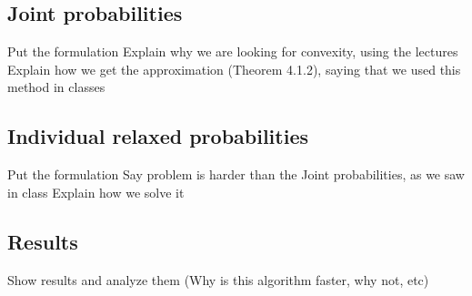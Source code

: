 \documentclass{beamer}
\begin{document}
\subsection{Joint probabilities}
\begin{frame}
Put the formulation
Explain why we are looking for convexity, using the lectures
Explain how we get the approximation (Theorem 4.1.2), saying that we used this method in classes

\end{frame}

\subsection{Individual relaxed probabilities}
\begin{frame}
Put the formulation
Say problem is harder than the Joint probabilities, as we saw in class
Explain how we solve it
\end{frame}

\subsection{Results}
\begin{frame}
Show results and analyze them (Why is this algorithm faster, why not, etc)
\end{frame}
\end{document}
